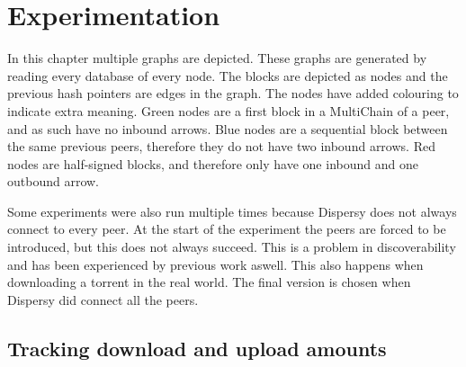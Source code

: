 \chapter{Experimentation}

In this chapter multiple graphs are depicted.
These graphs are generated by reading every database of every node.
The blocks are depicted as nodes and the previous hash pointers are edges in the graph.
The nodes have added colouring to indicate extra meaning.
Green nodes are a first block in a MultiChain of a peer,
and as such have no inbound arrows.
Blue nodes are a sequential block between the same previous peers,
therefore they do not have two inbound arrows.
Red nodes are half-signed blocks,
and therefore only have one inbound and one outbound arrow.

Some experiments were also run multiple times because Dispersy does not always connect to every peer.
At the start of the experiment the peers are forced to be introduced,
but this does not always succeed.
This is a problem in discoverability and has been experienced by previous work aswell\cite{ruigrok-anonymous}.
This also happens when downloading a torrent in the real world.
The final version is chosen when Dispersy did connect all the peers.





\section{Tracking download and upload amounts}






